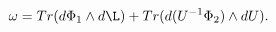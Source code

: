 \begin{equation}\label{f2}
  \omega=Tr(d \Phi_1\wedge d  \L)+
  Tr(d  (U^{-1}\Phi_2) \wedge d  U ).
\end{equation}

